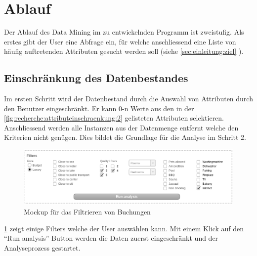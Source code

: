 
\section{Ablauf}
\label{sec:konzept:ablauf}
Der Ablauf des Data Mining im zu entwickelnden Programm ist zweistufig. Als erstes gibt der User eine Abfrage ein, für welche anschliessend eine Liste von häufig auftretenden Attributen gesucht werden soll (siehe \cref{sec:einleitung:ziel} ).


\subsection{Einschränkung des Datenbestandes}
\label{sec:konzept:ablauf:einschraenkung}
Im ersten Schritt wird der Datenbestand durch die Auswahl von Attributen durch den Benutzer eingeschränkt. Er kann 0-n Werte aus den in der \cref{fig:recherche:attributeinschraenkung:2} gelisteten Attributen selektieren. Anschliessend werden alle Instanzen aus der Datenmenge entfernt welche den Kriterien nicht genügen. Dies bildet die Grundlage für die Analyse im Schritt 2.

\begin{figure}[H]
	\RawFloats
	\centering
	\includegraphics[width=1\textwidth]{images/wireframe-filtering}
	\caption{Mockup für das Filtrieren von Buchungen}
	\label{fig:konzept:ablauf:einschraenkung:1}
\end{figure}

\cref{fig:konzept:ablauf:einschraenkung:1} zeigt einige Filters welche der User auswählen kann. Mit einem Klick auf den "`Run analysis"' Button werden die Daten zuerst eingeschränkt und der Analyseprozess gestartet.

